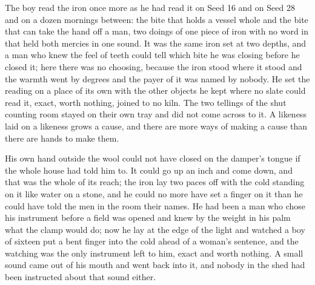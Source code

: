The boy read the iron once more as he had read it on Seed 16 and on Seed 28 and on a dozen mornings between: the bite that holds a vessel whole and the bite that can take the hand off a man, two doings of one piece of iron with no word in  that held both mercies in one sound. It was the same iron set at two depths, and a man who knew the feel of teeth could tell which bite he was closing before he closed it; here there was no choosing, because the iron stood where it stood and the warmth went by degrees and the payer of it was named by nobody. He set the reading on a place of its own with the other objects he kept where no slate could read it, exact, worth nothing, joined to no kiln. The two tellings of the shut counting room stayed on their own tray and did not come across to it. A likeness laid on a likeness grows a cause, and there are more ways of making a cause than there are hands to make them.

His own hand outside the wool could not have closed on the damper's tongue if the whole house had told him to. It could go up an inch and come down, and that was the whole of its reach; the iron lay two paces off with the cold standing on it like water on a stone, and he could no more have set a finger on it than he could have told the men in the room their names. He had been a man who chose his instrument before a field was opened and knew by the weight in his palm what the clamp would do; now he lay at the edge of the light and watched a boy of sixteen put a bent finger into the cold ahead of a woman's sentence, and the watching was the only instrument left to him, exact and worth nothing. A small sound came out of his mouth and went back into it, and nobody in the shed had been instructed about that sound either.

